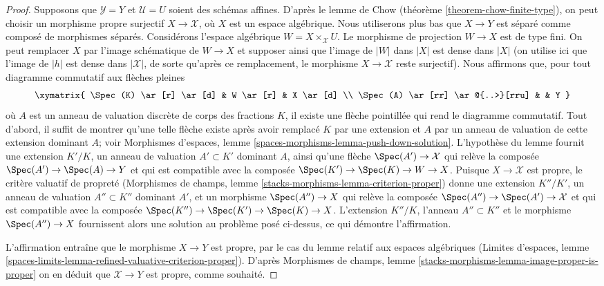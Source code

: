 \begin{proof}
\medskip\noindent
Supposons que $\mathcal{Y} = Y$ et $\mathcal{U} = U$ soient des schémas affines.
D'après le lemme de Chow (théorème \ref{theorem-chow-finite-type}),
on peut choisir un morphisme propre surjectif $X \to \mathcal{X}$,
où $X$ est un espace algébrique. Nous utiliserons plus bas que $X \to Y$ est séparé
comme composé de morphismes séparés. Considérons
l'espace algébrique $W = X \times_\mathcal{X} U$. Le morphisme de projection
$W \to X$ est de type fini.
On peut remplacer $X$ par l'image schématique de
$W \to X$ et supposer ainsi que l'image de $|W|$ dans $|X|$
est dense dans $|X|$ (on utilise ici que l'image de $|h|$
est dense dans $|\mathcal{X}|$, de sorte qu'après ce remplacement, le
morphisme $X \to \mathcal{X}$ reste surjectif).
Nous affirmons que, pour tout diagramme commutatif aux flèches pleines
$$
\xymatrix{
\Spec(K) \ar[r] \ar[d] & W \ar[r] & X \ar[d] \\
\Spec(A) \ar[rr] \ar@{..>}[rru] & & Y
}
$$
où $A$ est un anneau de valuation discrète de corps des fractions $K$, il
existe une flèche pointillée qui rend le diagramme commutatif. Tout d'abord, il suffit de
montrer qu'une telle flèche existe après avoir remplacé $K$ par une extension
et $A$ par un anneau de valuation de cette extension dominant $A$; voir
Morphismes d'espaces, lemme \ref{spaces-morphisms-lemma-push-down-solution}.
L'hypothèse du lemme fournit une extension $K'/K$, un anneau de
valuation $A' \subset K'$ dominant $A$, ainsi
qu'une flèche $\Spec(A') \to \mathcal{X}$ qui relève la composée
$\Spec(A') \to \Spec(A) \to Y$ et qui est compatible avec la composée
$\Spec(K') \to \Spec(K) \to W \to X$. Puisque $X \to \mathcal{X}$
est propre, le critère valuatif de propreté
(Morphismes de champs, lemme \ref{stacks-morphisms-lemma-criterion-proper})
donne une extension $K''/K'$, un anneau de valuation $A'' \subset K''$
dominant $A'$, et un morphisme $\Spec(A'') \to X$ qui relève la composée
$\Spec(A'') \to \Spec(A') \to \mathcal{X}$ et qui est compatible avec la composée
$\Spec(K'') \to \Spec(K') \to \Spec(K) \to X$.
L'extension $K''/K$, l'anneau $A'' \subset K''$ et le morphisme $\Spec(A'') \to X$
fournissent alors une solution au problème posé ci-dessus, ce qui démontre l'affirmation.

\medskip\noindent
L'affirmation entraîne que le morphisme $X \to Y$ est propre, par le
cas du lemme relatif aux espaces algébriques
(Limites d'espaces, lemme
\ref{spaces-limits-lemma-refined-valuative-criterion-proper}).
D'après Morphismes de champs, lemme
\ref{stacks-morphisms-lemma-image-proper-is-proper}
on en déduit que $\mathcal{X} \to Y$ est propre, comme souhaité.
\end{proof}

